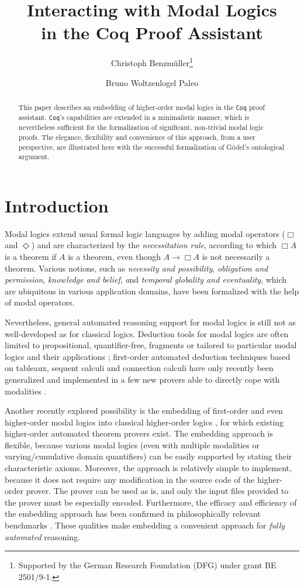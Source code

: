 \documentclass{llncs}
\title{
Interacting with Modal Logics \\
in the Coq Proof Assistant
}
\author{
  Christoph Benzm\"{u}ller\inst{1}\thanks{Supported by the German Research Foundation (DFG) under grant BE 2501/9-1.} 
  \and 
  Bruno Woltzenlogel Paleo\inst{2}
}
\institute{
  Freie Universit\"{a}t Berlin, Germany,  %
  \email{c.benzmueller@fu-berlin.de}
  \and 
  Vienna University of Technology, Austria, %
   \email{bruno@logic.at}
}
\newcommand{\imp}{\rightarrow}
\newcommand{\Coq}{\texttt{Coq}\xspace}
\begin{document}
\maketitle

\begin{abstract}  
  This paper describes an embedding of higher-order modal logics in
  the \Coq proof assistant. {\Coq}'s capabilities are extended in a
  minimalistic manner, which is nevertheless sufficient for the
  formalization of significant, non-trivial modal logic proofs. The
  elegance, flexibility and convenience of this approach, from a user
  perspective, are illustrated here with the successful formalization
  of G\"odel's ontological argument.
\end{abstract}



\section{Introduction}

Modal logics \cite{ModalLogic} extend usual formal logic languages by adding modal
operators ($\Box$ and $\Diamond$) and are characterized by the
\emph{necessitation rule}, according to which $\Box A$ is a theorem if
$A$ is a theorem, even though $A \imp \Box A$ is not necessarily a
theorem. Various notions, such as \emph{necessity and
possibility}, \emph{obligation and permission}, 
\emph{knowledge and belief}, \emph and \emph{temporal
globality and eventuality}, which are ubiquitous in various application domains,
have been formalized with the help of modal operators.

Nevertheless, general automated reasoning support for modal logics is still
not as well-developed as for classical logics. Deduction tools
for modal logics are often limited to propositional, quantifier-free,
fragments or tailored to particular
modal logics and their applications \cite{CoLoSS1,CoLoSS2,ConditionalTableaux,COOL,ModalProvers,Coalescing}; 
first-order automated deduction techniques based on tableaux, sequent
calculi and connection calculi have only recently been generalized 
and implemented in a few new provers able to directly cope with
modalities \cite{JensOtten}.

Another recently explored possibility is the embedding of first-order
and even higher-order modal logics into classical higher-order logics
\cite{J23,B9,J22}, for which existing higher-order automated theorem
provers \cite{LEO-II,Satallax} exist. The embedding approach is
flexible, because various modal logics (even with multiple modalities
or varying/cumulative domain quantifiers) can be easily supported by
stating their characteristic axioms. Moreover, the approach is
relatively simple to implement, because it does not require any
modification in the source code of the higher-order prover. The prover
can be used as is, and only the input files provided to the prover
must be especially encoded. Furthermore, the efficacy and efficiency
of the embedding approach has been confirmed in philosophically
relevant benchmarks \cite{FormalTheologyRepository}. These qualities
make embedding a convenient approach for \emph{fully automated}
reasoning.
\end{document}
